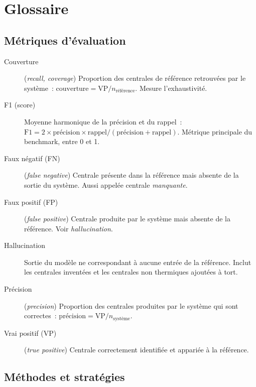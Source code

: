 
\chapter*{Glossaire}

\section*{Métriques d'évaluation}

\begin{description}
\item[Couverture] (\emph{recall, coverage}) Proportion des centrales de référence retrouvées par le système~: $\text{couverture} = \text{VP} / n_{\text{référence}}$. Mesure l'exhaustivité.
\item[F1 (score)] Moyenne harmonique de la précision et du rappel~: $\text{F1} = 2 \times \text{précision} \times \text{rappel} / (\text{précision} + \text{rappel})$. Métrique principale du benchmark, entre 0 et 1.
\item[Faux négatif (FN)] (\emph{false negative}) Centrale présente dans la référence mais absente de la sortie du système. Aussi appelée centrale \emph{manquante}.
\item[Faux positif (FP)] (\emph{false positive}) Centrale produite par le système mais absente de la référence. Voir \emph{hallucination}.
\item[Hallucination] Sortie du modèle ne correspondant à aucune entrée de la référence. Inclut les centrales inventées et les centrales non thermiques ajoutées à tort.
\item[Précision] (\emph{precision}) Proportion des centrales produites par le système qui sont correctes~: $\text{précision} = \text{VP} / n_{\text{système}}$.
\item[Vrai positif (VP)] (\emph{true positive}) Centrale correctement identifiée et appariée à la référence.
\end{description}

\section*{Méthodes et stratégies}

